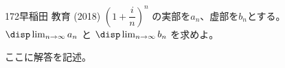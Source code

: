 \begin{thm}{172}{}{早稲田 教育 (2018)}
 $\left(1+\dfrac{i}{n}\right)^n$ の実部を$a_n$、虚部を$b_n$とする。$\disp \lim_{n\to\infty} a_n$ と $\disp \lim_{n\to\infty} b_n$ を求めよ。
\end{thm}

ここに解答を記述。